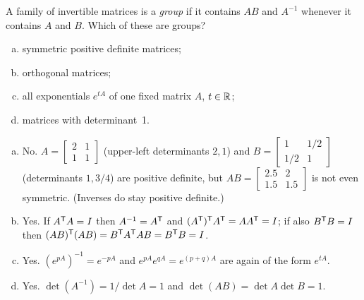 \begin{exercise}\label{exr:u29-groups}
A family of invertible matrices is a \emph{group} if it contains $AB$ and $A^{-1}$ whenever it
contains $A$ and $B$. Which of these are groups?
\begin{enumerate}[(a)]
  \item symmetric positive definite matrices;
  \item orthogonal matrices;
  \item all exponentials $e^{tA}$ of one fixed matrix $A$, $t\in\mathbb{R}$;
  \item matrices with determinant~1.
\end{enumerate}
\end{exercise}
\begin{solution}
\begin{enumerate}[(a)]
  \item No. $A=\left[\begin{smallmatrix}2&1\\1&1\end{smallmatrix}\right]$ (upper-left determinants $2,1$) and
        $B=\left[\begin{smallmatrix}1&1/2\\1/2&1\end{smallmatrix}\right]$ (determinants $1,3/4$) are positive
        definite, but $AB=\left[\begin{smallmatrix}2.5&2\\1.5&1.5\end{smallmatrix}\right]$ is not even
        symmetric. (Inverses do stay positive definite.)
  \item Yes. If $A^{\mathsf{T}} A=I$ then $A^{-1}=A^{\mathsf{T}}$ and $(A^{\mathsf{T}})^{\mathsf{T}} A^{\mathsf{T}}=AA^{\mathsf{T}}=I$; if also $B^{\mathsf{T}} B=I$ then
        $(AB)^{\mathsf{T}}(AB)=B^{\mathsf{T}} A^{\mathsf{T}} AB=B^{\mathsf{T}} B=I$.
  \item Yes. $(e^{pA})^{-1}=e^{-pA}$ and $e^{pA}e^{qA}=e^{(p+q)A}$ are again of the form $e^{tA}$.
  \item Yes. $\det(A^{-1})=1/\det A=1$ and $\det(AB)=\det A\det B=1$.
\end{enumerate}
\end{solution}


